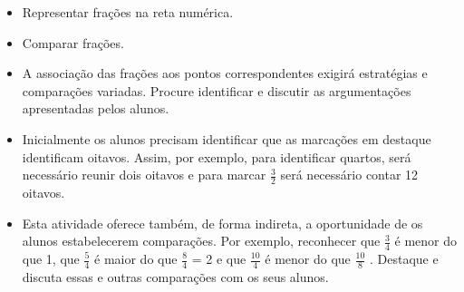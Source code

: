 \begin{atividade}\label{chap3-ativ12}
\objetivos
\begin{itemize} %
    \item       Representar frações na reta numérica.
    \item       Comparar frações.
\end{itemize} %

\discussoes
\begin{itemize}
     \item  A associação das frações aos pontos correspondentes exigirá estratégias e comparações variadas. Procure identificar e discutir as argumentações apresentadas pelos alunos.
     \item  Inicialmente os alunos precisam identificar que as marcações em destaque identificam oitavos. Assim, por exemplo, para identificar quartos, será necessário reunir dois oitavos e para marcar   $\frac{3}{2}$   será necessário contar 12 oitavos.
     \item  Esta atividade oferece também, de forma indireta, a oportunidade de os alunos estabelecerem comparações. Por exemplo, reconhecer que   $\frac{3}{4}$   é menor do que 1, que   $\frac{5}{4}$   é maior do que   $\frac{8}{4}$   = 2 e que   $\frac{10}{4}$   é menor do que   $\frac{10}{8}$  . Destaque e discuta essas e outras comparações com os seus alunos.
\end{itemize}

\solucao
\begin{center}
\end{center}
\end{atividade}

